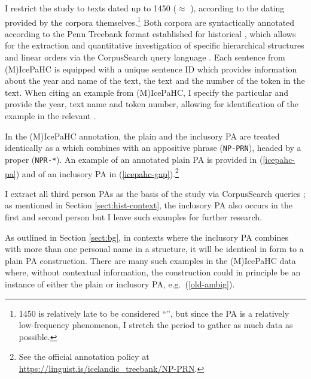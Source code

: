 \documentclass[output=paper,colorlinks,citecolor=brown]{langscibook}
\begin{document}
I restrict the study to texts dated up to 1450 ($\approx$ ), according to the dating provided by the corpora themselves.\footnote{1450 is relatively late to be considered ``'', but since the PA is a relatively low-frequency phenomenon, I stretch the period to gather as much data as possible.} Both corpora are syntactically  annotated according to the Penn Treebank format established for historical  \citep{Santorini2010annotation}, which allows for the extraction and quantitative investigation of specific hierarchical structures and linear orders via the CorpusSearch query language \citep{randall2005corpussearch2}. Each sentence from (M)IcePaHC is equipped with a unique sentence ID which provides information about the year and name of the text, the text  and the number of the token in the text. When citing an example from (M)IcePaHC, I specify the particular  and provide the year, text name and token number, allowing for identification of the example in the relevant . 

In the (M)IcePaHC annotation, the plain and the inclusory PA are treated identically as a  which combines with an appositive  phrase (\texttt{NP-PRN}), headed by a proper  (\texttt{NPR-*}). An example of an annotated plain PA is provided in (\ref{icepahc-pa}) and of an inclusory PA in (\ref{icepahc-gap}).\footnote{See the official annotation policy at \url{https://linguist.is/icelandic_treebank/NP-PRN}.}

\ea 
\z 
\z



I extract all third person PAs as the basis of the study via CorpusSearch queries \citep{randall2005corpussearch2};  as mentioned in Section \ref{sect:hist-context}, the inclusory PA also occurs in the first and second person but I leave such examples for further research. 

\begin{sloppypar}
As outlined in Section \ref{sect:bg}, in contexts where the inclusory PA combines with more than one personal name in a  structure, it will be identical in form to a plain PA construction.
There are many such examples in the (M)IcePaHC data where, without contextual information, the construction could in principle be an instance of either the plain or inclusory PA, e.g.~(\ref{old-ambig}).
\end{sloppypar}
\end{document}

